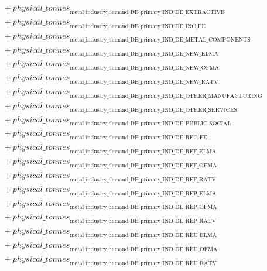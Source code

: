 \documentclass[11pt]{article}
\begin{document}
\begin{align*}
&\quad {}+ {physical\_tonnes}_{\text{metal\_industry\_demand\_DE\_primary\_IND\_DE\_EXTRACTIVE}}\\
&\quad {}+ {physical\_tonnes}_{\text{metal\_industry\_demand\_DE\_primary\_IND\_DE\_INC\_EE}}\\
&\quad {}+ {physical\_tonnes}_{\text{metal\_industry\_demand\_DE\_primary\_IND\_DE\_METAL\_COMPONENTS}}\\
&\quad {}+ {physical\_tonnes}_{\text{metal\_industry\_demand\_DE\_primary\_IND\_DE\_NEW\_ELMA}}\\
&\quad {}+ {physical\_tonnes}_{\text{metal\_industry\_demand\_DE\_primary\_IND\_DE\_NEW\_OFMA}}\\
&\quad {}+ {physical\_tonnes}_{\text{metal\_industry\_demand\_DE\_primary\_IND\_DE\_NEW\_RATV}}\\
&\quad {}+ {physical\_tonnes}_{\text{metal\_industry\_demand\_DE\_primary\_IND\_DE\_OTHER\_MANUFACTURING}}\\
&\quad {}+ {physical\_tonnes}_{\text{metal\_industry\_demand\_DE\_primary\_IND\_DE\_OTHER\_SERVICES}}\\
&\quad {}+ {physical\_tonnes}_{\text{metal\_industry\_demand\_DE\_primary\_IND\_DE\_PUBLIC\_SOCIAL}}\\
&\quad {}+ {physical\_tonnes}_{\text{metal\_industry\_demand\_DE\_primary\_IND\_DE\_REC\_EE}}\\
&\quad {}+ {physical\_tonnes}_{\text{metal\_industry\_demand\_DE\_primary\_IND\_DE\_REF\_ELMA}}\\
&\quad {}+ {physical\_tonnes}_{\text{metal\_industry\_demand\_DE\_primary\_IND\_DE\_REF\_OFMA}}\\
&\quad {}+ {physical\_tonnes}_{\text{metal\_industry\_demand\_DE\_primary\_IND\_DE\_REF\_RATV}}\\
&\quad {}+ {physical\_tonnes}_{\text{metal\_industry\_demand\_DE\_primary\_IND\_DE\_REP\_ELMA}}\\
&\quad {}+ {physical\_tonnes}_{\text{metal\_industry\_demand\_DE\_primary\_IND\_DE\_REP\_OFMA}}\\
&\quad {}+ {physical\_tonnes}_{\text{metal\_industry\_demand\_DE\_primary\_IND\_DE\_REP\_RATV}}\\
&\quad {}+ {physical\_tonnes}_{\text{metal\_industry\_demand\_DE\_primary\_IND\_DE\_REU\_ELMA}}\\
&\quad {}+ {physical\_tonnes}_{\text{metal\_industry\_demand\_DE\_primary\_IND\_DE\_REU\_OFMA}}\\
&\quad {}+ {physical\_tonnes}_{\text{metal\_industry\_demand\_DE\_primary\_IND\_DE\_REU\_RATV}}\\

\end{align*}
\end{document}
